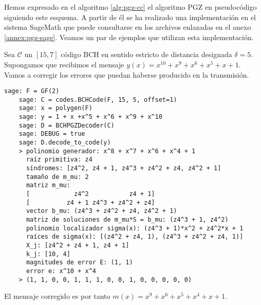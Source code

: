 Hemos expresado en el algoritmo \ref{alg:pgz-cc} el algoritmo PGZ en pseudocódigo siguiendo este esquema.
A partir de él se ha realizado una implementación en el sistema SageMath que puede consultarse en los archivos enlazadas en el anexo \ref{annex:pgz-sage}.
Veamos un par de ejemplos que utilizan esta implementación.

\begin{example}
  Sea \(\mathcal C\) un \([15, 7]\) código BCH en sentido estricto de distancia designada \(\delta = 5\).
  Supongamos que recibimos el mensaje \(y(x) = x^{10} + x^9 + x^6 + x^5 + x + 1\).
  Vamos a corregir los errores que puedan haberse producido en la transmisión.
  \begin{lstlisting}[gobble=4]
    sage: F = GF(2)
    sage: C = codes.BCHCode(F, 15, 5, offset=1)
    sage: x = polygen(F)
    sage: y = 1 + x +x^5 + x^6 + x^9 + x^10
    sage: D = BCHPGZDecoder(C)
    sage: DEBUG = true
    sage: D.decode_to_code(y)
    > polinomio generador: x^8 + x^7 + x^6 + x^4 + 1
      raíz primitiva: z4
      síndromes: [z4^2, z4 + 1, z4^3 + z4^2 + z4, z4^2 + 1]
      tamaño de m_mu: 2
      matriz m_mu: 
      [            z4^2           z4 + 1]
      [          z4 + 1 z4^3 + z4^2 + z4]
      vector b_mu: (z4^3 + z4^2 + z4, z4^2 + 1)
      matriz de soluciones de m_mu*S = b_mu: (z4^3 + 1, z4^2)
      polinomio localizador sigma(x): (z4^3 + 1)*x^2 + z4^2*x + 1
      raíces de sigma(x): [(z4^2 + z4, 1), (z4^3 + z4^2 + z4, 1)]
      X_j: [z4^2 + z4 + 1, z4 + 1]
      k_j: [10, 4]
      magnitudes de error E: (1, 1)
      error e: x^10 + x^4
    > (1, 1, 0, 0, 1, 1, 1, 0, 0, 1, 0, 0, 0, 0, 0)
  \end{lstlisting}
  El mensaje corregido es por tanto \(m(x) = x^9 + x^6 + x^5 + x^4 + x + 1\).
\end{example}

